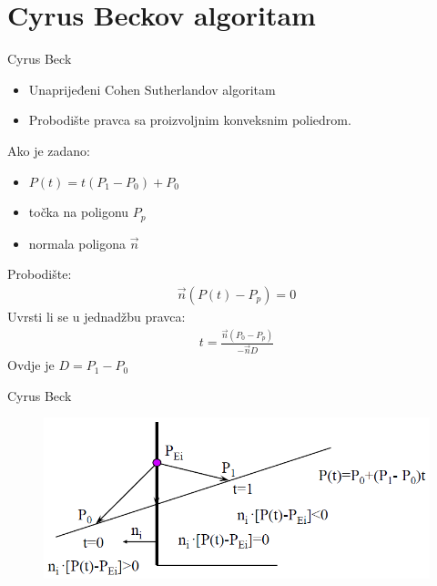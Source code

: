 \documentclass[9pt]{beamer}
\begin{document}
\section{Cyrus Beckov algoritam}
\begin{frame}{Cyrus Beck}
	\begin{block}{}
		\begin{itemize}
			\item Unaprijeđeni Cohen Sutherlandov algoritam
			\item Probodište pravca sa proizvoljnim konveksnim poliedrom.
		\end{itemize}
	\end{block}
Ako je zadano:
\begin{itemize}
	\item $P(t) = t(P_1-P_0) + P_0$
	\item točka na poligonu $P_p$
	\item normala poligona $\vec{n}$
\end{itemize}
Probodište:
\begin{align*}
\vec{n}\left( P(t) - P_p\right)=0
\end{align*}
Uvrsti li se u jednadžbu pravca:
\begin{align*}
t = \frac{\vec{n}\left(P_0-P_p\right)}{-\vec{n}D}
\end{align*}
Ovdje je $D = P_1-P_0$
\end{frame}
\begin{frame}{Cyrus Beck}
	\begin{figure}
		\centering
		\includegraphics[width=0.7\linewidth]{slike/cyrus_beck01.png}
	\end{figure}
\end{frame}
\end{document}
